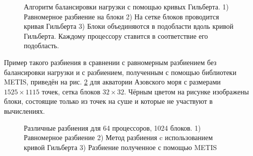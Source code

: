     
    \begin{figure}[htb!]
    \begin{minipage}[h]{0.32\linewidth}
    \end{minipage}
    \hfill
    \begin{minipage}[h]{0.32\linewidth}
    \end{minipage}
    \hfill
    \begin{minipage}[h]{0.32\linewidth}
    \end{minipage}
    \caption{Алгоритм балансировки нагрузки с помощью кривых Гильберта. 1) Равномерное разбиение на блоки 
             2) На сетке блоков проводится кривая Гильберта
             3) Блоки объединяются в подобласти вдоль кривой Гильберта.
                Каждому процессору ставится в соответствие его подобласть. }
    \label{fig:LBalgo}
    \end{figure}
    
    
Пример такого разбиения в сравнении с равномерным разбиением без балансировки нагрузки и с разбиением, полученным с помощью библиотеки METIS,
приведён на рис. \ref{fig:map_uniform_hilbert_metis} для акватории Азовского моря с размерами $1525 \times 1115$ точек, 
сетка блоков $32 \times 32$.
Чёрным цветом на рисунке изображены блоки, состоящие только из точек на суше и которые не
участвуют в вычислениях.
    
    \begin{figure}[htb!]
    \begin{minipage}[h]{0.32\linewidth}
    \end{minipage}
    \hfill
    \begin{minipage}[h]{0.32\linewidth}
    \end{minipage}
    \hfill
    \begin{minipage}[h]{0.32\linewidth}
    \end{minipage}
    \caption{Различные разбиения для 64 процессоров, 1024 блоков. 1) Равномерное разбиение 2) Метод разбиения c использованием кривой Гильберта 
             3) Разбиение полученное с помощью METIS}
    \label{fig:map_uniform_hilbert_metis}
    \end{figure}
    
